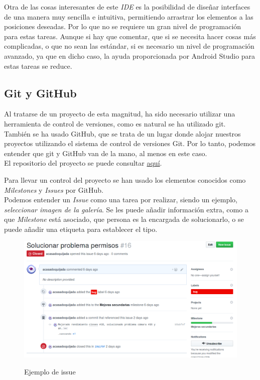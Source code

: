 Otra de las cosas interesantes de este \textit{IDE} es la posibilidad de diseñar interfaces de una manera muy sencilla e intuitiva, permitiendo arrastrar los elementos a las posiciones deseadas. Por lo que no se requiere un gran nivel de programación para estas tareas. Aunque si hay que comentar, que si se necesita hacer cosas más complicadas, o que no sean las estándar, si es necesario un nivel de programación avanzado, ya que en dicho caso, la ayuda proporcionada por Android Studio para estas tareas se reduce.\\ 

\subsection{Git y GitHub}

Al tratarse de un proyecto de esta magnitud, ha sido necesario utilizar una herramienta de control de versiones, como es natural se ha utilizado git.\\

También se ha usado GitHub, que se trata de un lugar donde alojar nuestros proyectos utilizando el sistema de control de versiones Git. Por lo tanto, podemos entender que git y GitHub van de la mano, al menos en este caso.\\

El repositorio del proyecto se puede consultar \href{https://github.com/acasadoquijada/jmr-android}{aquí}.

Para llevar un control del proyecto se han usado los elementos conocidos como \textit{Milestones} y \textit{Issues} por GitHub.\\

Podemos entender un \textit{Issue} como una tarea por realizar, siendo un ejemplo, \textit{seleccionar imagen de la galería}. Se les puede añadir información extra, como a que \textit{Milestone} está asociado, que persona es la encargada de solucionarlo, o se puede añadir una etiqueta para establecer el tipo.\\

\begin{figure}[H] %
\centering
\includegraphics[scale=0.4]{imagenes/issue.png}  %
\label{issue.png}
\caption{Ejemplo de issue}
\end{figure}

